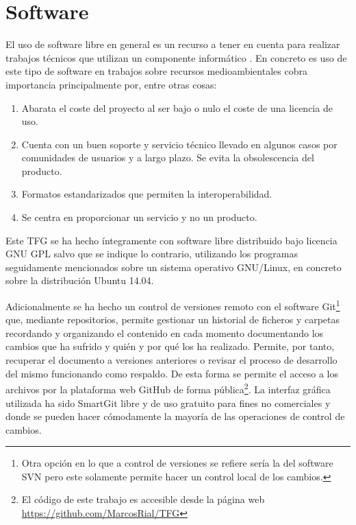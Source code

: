 \section{Software} \label{sec:software}
El uso de software libre en general es un recurso a tener en cuenta para realizar trabajos técnicos que utilizan un componente informático \citep{MatellanOliveira2004} \citep{Mas2005software}. En concreto es uso de este tipo de software en trabajos sobre recursos medioambientales cobra importancia principalmente por, entre otras cosas:

\begin{enumerate}
	\item Abarata el coste del proyecto al ser bajo o nulo el coste de una licencia de uso.
	\item Cuenta con un buen soporte y servicio técnico llevado en algunos casos por comunidades de usuarios y a largo plazo. Se evita la obsolescencia del producto.
	\item Formatos estandarizados que permiten la interoperabilidad.
	\item Se centra en proporcionar un servicio y no un producto.
\end{enumerate}

Este \ac{TFG} se ha hecho íntegramente con software libre distribuido bajo licencia GNU GPL salvo que se indique lo contrario, utilizando los programas seguidamente mencionados sobre un sistema operativo GNU/Linux, en concreto sobre la distribución Ubuntu 14.04.\Sep

Adicionalmente se ha hecho un control de versiones remoto con el software Git\footnote{Otra opción en lo que a control de versiones se refiere sería la del software \ac{SVN} \citep{Latex2011} pero este solamente permite hacer un control local de los cambios.} que, mediante repositorios, permite gestionar un historial de ficheros y carpetas recordando y organizando el contenido en cada momento documentando los cambios que ha sufrido y quién y por qué los ha realizado. Permite, por tanto, recuperar el documento a versiones anteriores o revisar el proceso de desarrollo del mismo funcionando como respaldo. De esta forma se permite el acceso a los archivos por la plataforma web GitHub de forma pública\footnote{El código de este trabajo es accesible desde la página web \url{https://github.com/MarcosRial/TFG}}. La interfaz gráfica utilizada ha sido SmartGit \citep{GmbH2015} libre y de uso gratuito para fines no comerciales y donde se pueden hacer cómodamente la mayoría de las operaciones de control de cambios.\Sep

